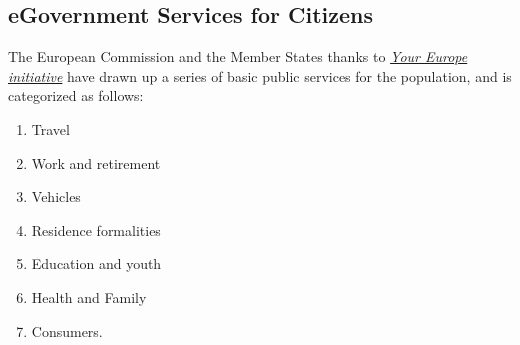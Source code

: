 \newpage

\subsection{eGovernment Services for Citizens}
The European Commission and the Member States thanks to \href{https://europa.eu/youreurope/citizens/index_en.htm}{\emph{Your Europe initiative}} have drawn up a series of basic public services for the population, and is categorized as follows:
\begin{enumerate}
\setlength{\itemsep}{0pt}
\setlength{\parskip}{0pt}
\item Travel
\item Work and retirement
\item Vehicles
\item Residence formalities
\item Education and youth
\item Health and Family
\item Consumers.
\end{enumerate}

